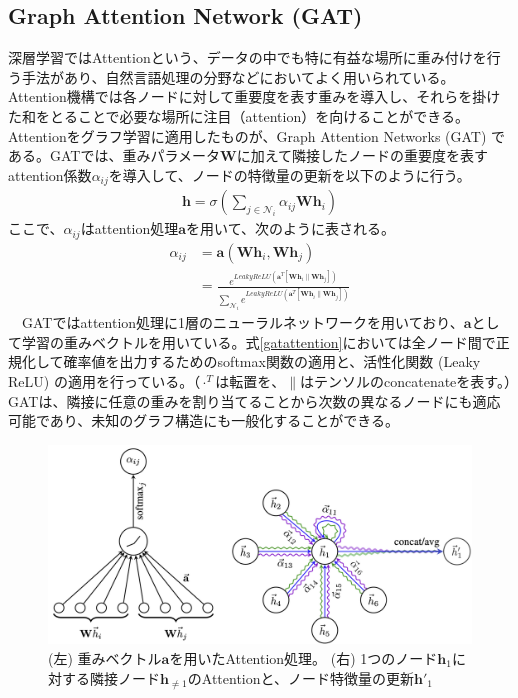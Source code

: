 \subsection{Graph Attention Network (GAT)}
\label{GATexplain}
深層学習ではAttentionという、データの中でも特に有益な場所に重み付けを行う手法があり、自然言語処理の分野などにおいてよく用いられている。Attention機構では各ノードに対して重要度を表す重みを導入し、それらを掛けた和をとることで必要な場所に注目（attention）を向けることができる。Attentionをグラフ学習に適用したものが、Graph Attention Networks (GAT) \cite{gat} である。GATでは、重みパラメータ$\mathbf{W}$に加えて隣接したノードの重要度を表すattention係数$\alpha_{ij}$を導入して、ノードの特徴量の更新を以下のように行う。
\begin{align}
\mathbf{h} = \sigma (\sum_{j \in \mathcal{N}_i} \alpha_{ij} \mathbf{W} \mathbf{h}_i )
\end{align}
ここで、$\alpha_{ij}$はattention処理$\mathbf{a}$を用いて、次のように表される。
\begin{align}
\alpha_{ij} &= \mathbf{a}(\mathbf{W}\mathbf{h}_i, \mathbf{W}\mathbf{h}_j)\\
 &= \frac{e^{LeakyReLU(\mathbf{a}^T [ \mathbf{W}\mathbf{h}_i \parallel \mathbf{W}\mathbf{h}_j ])}}{\sum_{\mathcal{N}_i} e^{LeakyReLU(\mathbf{a}^T [ \mathbf{W}\mathbf{h}_i \parallel  \mathbf{W}\mathbf{h}_j ])}}
\label{gatattention}
\end{align}
　GATではattention処理に1層のニューラルネットワークを用いており、$\mathbf{a}$として学習の重みベクトルを用いている。式\ref{gatattention}においては全ノード間で正規化して確率値を出力するためのsoftmax関数の適用と、活性化関数 (Leaky ReLU) の適用を行っている。（$\cdot^T$は転置を、$\parallel$はテンソルのconcatenateを表す。）GATは、隣接に任意の重みを割り当てることから次数の異なるノードにも適応可能であり、未知のグラフ構造にも一般化することができる。
\begin{figure}[H]
	\begin{center}
 \includegraphics[keepaspectratio, scale=0.25]
 	{Figure/Deeplearning/gat.png}
 		\caption{ (左) 重みベクトル$\mathbf{a}$を用いたAttention処理。 (右) 1つのノード$\mathbf{h}_1$に対する隣接ノード$\mathbf{h}_{\neq 1}$のAttentionと、ノード特徴量の更新$\mathbf{h'}_1$}
	\end{center}
\end{figure}